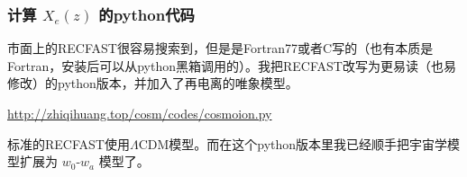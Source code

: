\documentclass[CJK,13pt]{beamer}
\begin{document}
  \begin{frame}
    \frametitle{计算 $X_e(z)$ 的python代码}
    市面上的RECFAST很容易搜索到，但是是Fortran77或者C写的（也有本质是Fortran，安装后可以从python黑箱调用的）。我把RECFAST改写为更易读（也易修改）的python版本，并加入了再电离的唯象模型。

    \skipline

    \url{http://zhiqihuang.top/cosm/codes/cosmoion.py}

        \skipline
    
    标准的RECFAST使用$\Lambda$CDM模型。而在这个python版本里我已经顺手把宇宙学模型扩展为 $w_0$-$w_a$ 模型了。
  \end{frame}

  
  
  \ech
\end{document}
